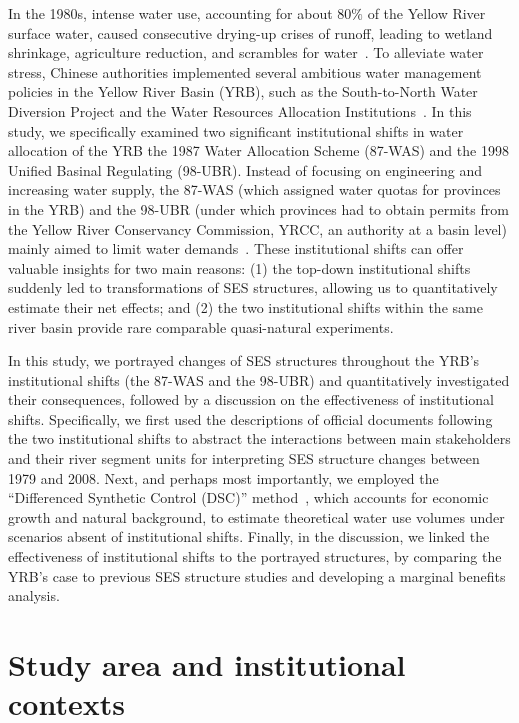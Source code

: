 \documentclass[preprint, 12pt]{elsarticle}
\begin{document}
In the 1980s, intense water use, accounting for about $80\%$ of the Yellow River surface water, caused consecutive drying-up crises of runoff, leading to wetland shrinkage, agriculture reduction, and scrambles for water~\cite{wohlfart2016}.
To alleviate water stress, Chinese authorities implemented several ambitious water management policies in the Yellow River Basin (YRB), such as the South-to-North Water Diversion Project and the Water Resources Allocation Institutions~\cite{long2020, wang2019d}.
In this study, we specifically examined two significant institutional shifts in water allocation of the YRB\: the 1987 Water Allocation Scheme (87-WAS) and the 1998 Unified Basinal Regulating (98-UBR).
Instead of focusing on engineering and increasing water supply, the 87-WAS (which assigned water quotas for provinces in the YRB) and the 98-UBR (under which provinces had to obtain permits from the Yellow River Conservancy Commission, YRCC, an authority at a basin level) mainly aimed to limit water demands~\cite{bouckaert2022, speed2013}.
These institutional shifts can offer valuable insights for two main reasons:
(1) the top-down institutional shifts suddenly led to transformations of SES structures, allowing us to quantitatively estimate their net effects; and (2) the two institutional shifts within the same river basin provide rare comparable quasi-natural experiments.

In this study, we portrayed changes of SES structures throughout the YRB's institutional shifts (the 87-WAS and the 98-UBR) and quantitatively investigated their consequences, followed by a discussion on the effectiveness of institutional shifts.
Specifically, we first used the descriptions of official documents following the two institutional shifts to abstract the interactions between main stakeholders and their river segment units for interpreting SES structure changes between 1979 and 2008.
Next, and perhaps most importantly, we employed the ``Differenced Synthetic Control (DSC)'' method~\cite{arkhangelsky2021}, which accounts for economic growth and natural background, to estimate theoretical water use volumes under scenarios absent of institutional shifts.
Finally, in the discussion, we linked the effectiveness of institutional shifts to the portrayed structures, by comparing the YRB's case to previous SES structure studies and developing a marginal benefits analysis.

\section{Study area and institutional contexts}\label{sec:yrb}
\end{document}
